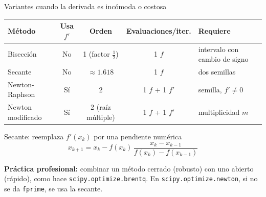 \documentclass[aspectratio=169,11pt]{beamer}
\begin{document}
\begin{frame}{Variantes cuando la derivada es incómoda o costosa}
  \begin{center}
  \footnotesize
  \begin{tabular}{@{}lcccp{}@{}}
    \toprule
    Método & Usa $f'$ & Orden & Evaluaciones/iter. & Requiere \\
    \midrule
    Bisección & No & 1 (factor $\tfrac12$) & 1 $f$ & intervalo con cambio de signo \\
    Secante & No & $\approx1.618$ & 1 $f$ & dos semillas \\
    Newton-Raphson & Sí & 2 & 1 $f$ + 1 $f'$ & semilla, $f'\neq0$ \\
    Newton modificado & Sí & 2 (raíz múltiple) & 1 $f$ + 1 $f'$ & multiplicidad $m$ \\
    \bottomrule
  \end{tabular}
  \end{center}
  \begin{block}{Secante: reemplaza $f'(x_k)$ por una pendiente numérica}
    \[
      x_{k+1}=x_k-f(x_k)\,\frac{x_k-x_{k-1}}{f(x_k)-f(x_{k-1})}
    \]
  \end{block}
  \textbf{Práctica profesional:} combinar un método cerrado (robusto) con uno abierto (rápido), como hace \texttt{scipy.optimize.brentq}. En \texttt{scipy.optimize.newton}, si no se da \texttt{fprime}, se usa la secante.
\end{frame}
\end{document}
